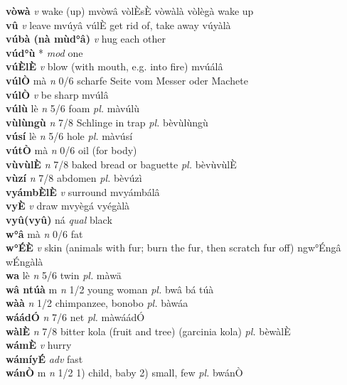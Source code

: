 \documentclass{article}
\begin{document}
{\bf vòwà}  {\it v} wake (up)   mvòwâ  vòlÈsÈ vòwàlà vòlègà wake up  \\ 
{\bf vû}  {\it v} leave   mvúyâ vúlÈ get rid of, take away  vúyàlà   \\ 
{\bf vúbà (nà mùd°â)}  {\it v} hug each other         \\ 
{\bf vúd°ù} * {\it mod} one         \\ 
{\bf vúÈlÈ}  {\it v} blow (with mouth, e.g. into fire)   mvúálâ      \\ 
{\bf vúlÒ} mà {\it n} 0/6 scharfe Seite vom Messer oder Machete         \\ 
{\bf vúlÒ}  {\it v} be sharp   mvúlâ      \\ 
{\bf vúlù} lè {\it n} 5/6 foam {\it pl.} màvúlù         \\ 
{\bf vùlùngù}  {\it n} 7/8 Schlinge in trap {\it pl.} bèvùlùngù         \\ 
{\bf vúsí} lè {\it n} 5/6 hole {\it pl.} màvúsí         \\ 
{\bf vútÒ} mà {\it n} 0/6 oil (for body)         \\ 
{\bf vùvùlÈ}  {\it n} 7/8 baked bread or baguette {\it pl.} bèvùvùlÈ         \\ 
{\bf vùzí}  {\it n} 7/8 abdomen {\it pl.} bèvúzì         \\ 
{\bf vyámbÈlÈ}  {\it v} surround   mvyámbálâ      \\ 
{\bf vyÈ}  {\it v} draw   mvyègá   vyégàlà   \\ 
{\bf vyû(vyû)} ná {\it qual} black         \\ 
{\bf w°â} mà {\it n} 0/6 fat         \\ 
{\bf w°ÉÈ}  {\it v} skin (animals with fur; burn the fur, then scratch fur off)   ngw°Éngâ   wÉngàlà   \\ 
{\bf wa} lè {\it n} 5/6 twin {\it pl.} màwä         \\ 
{\bf wâ ntúà} m {\it n} 1/2 young woman {\it pl.} bwâ bá túà         \\ 
{\bf wàà}  {\it n} 1/2 chimpanzee, bonobo {\it pl.} bàwáa         \\ 
{\bf wáádÓ}  {\it n} 7/6 net {\it pl.} màwáádÓ         \\ 
{\bf wàlÈ}  {\it n} 7/8 bitter kola (fruit and tree) (garcinia kola) {\it pl.} bèwàlÈ         \\ 
{\bf wámÈ}  {\it v} hurry         \\ 
{\bf wámíyÉ}  {\it adv} fast         \\ 
{\bf wánÒ} m {\it n} 1/2 1) child, baby 2) small, few {\it pl.} bwánÒ         \\ 
\end{document}
